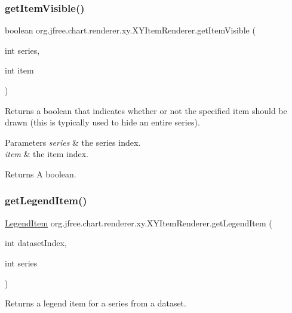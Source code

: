 \subsubsection{\texorpdfstring{get\+Item\+Visible()}{getItemVisible()}}
{\footnotesize\ttfamily boolean org.\+jfree.\+chart.\+renderer.\+xy.\+X\+Y\+Item\+Renderer.\+get\+Item\+Visible (\begin{DoxyParamCaption}\item[{int}]{series,  }\item[{int}]{item }\end{DoxyParamCaption})}

Returns a boolean that indicates whether or not the specified item should be drawn (this is typically used to hide an entire series).


\begin{DoxyParams}{Parameters}
{\em series} & the series index. \\
\hline
{\em item} & the item index.\\
\hline
\end{DoxyParams}
\begin{DoxyReturn}{Returns}
A boolean. 
\end{DoxyReturn}
\mbox{\label{interfaceorg_1_1jfree_1_1chart_1_1renderer_1_1xy_1_1_x_y_item_renderer_a792c3e8c39bf57711528cd8064d2ddb5}} 
\subsubsection{\texorpdfstring{get\+Legend\+Item()}{getLegendItem()}}
{\footnotesize\ttfamily \mbox{\hyperlink{classorg_1_1jfree_1_1chart_1_1_legend_item}{Legend\+Item}} org.\+jfree.\+chart.\+renderer.\+xy.\+X\+Y\+Item\+Renderer.\+get\+Legend\+Item (\begin{DoxyParamCaption}\item[{int}]{dataset\+Index,  }\item[{int}]{series }\end{DoxyParamCaption})}

Returns a legend item for a series from a dataset.


